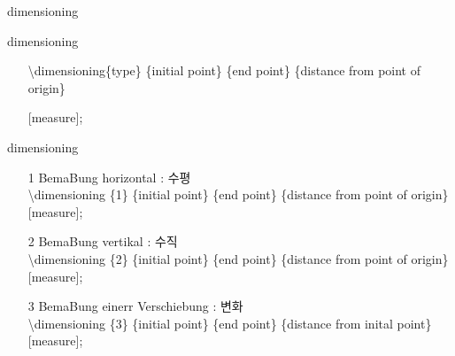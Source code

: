 \documentclass[ aspectratio=169,  12pt,blue,xcolor=pdftex,dvipsnames,table,handout,notes]{beamer}
\begin{document}
		\begin{frame}[t]{dimensioning}
 
				\begin{block}{dimensioning}
					\begin{itemize}
					\item[] \textbackslash dimensioning\{type\}
										\{initial point\}
										\{end point\}
										\{distance from point of origin\}
							\par \hspace{2cm} [measure];
					\end{itemize}
					\end{block}
		
					\begin{block}{dimensioning}
					\begin{itemize}
					\item[1] BemaBung horizontal : 수평 \\
							\textbackslash dimensioning		\{1\}
														\{initial point\}
														\{end point\}
														\{distance from point of origin\}
														[measure];
					\item[2] BemaBung vertikal : 수직 \\
							\textbackslash dimensioning		\{2\}						
														\{initial point\}
														\{end point\}
														\{distance from point of origin\}
														[measure];
					\item[3] BemaBung einerr Verschiebung : 변화 \\
							\textbackslash dimensioning		\{3\}
														\{initial point\}
														\{end point\}
														\{distance from inital point\}
														[measure];
					\end{itemize}
				\end{block}




				\begin{example}
				\end{example}

			\end{frame}
\end{document}
